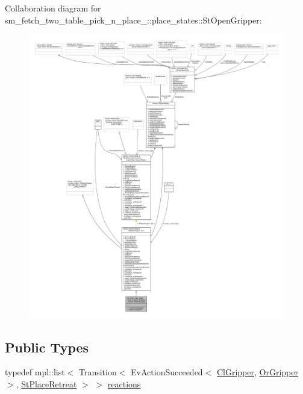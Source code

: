 Collaboration diagram for sm\+\_\+fetch\+\_\+two\+\_\+table\+\_\+pick\+\_\+n\+\_\+place\+\_\+:\+:place\+\_\+states\+:\+:St\+Open\+Gripper\+:
\nopagebreak
\begin{figure}[H]
\begin{center}
\leavevmode
\includegraphics[width=350pt]{structsm__fetch__two__table__pick__n__place__1_1_1place__states_1_1StOpenGripper__coll__graph}
\end{center}
\end{figure}
\subsection*{Public Types}
\begin{DoxyCompactItemize}
\item 
typedef mpl\+::list$<$ Transition$<$ Ev\+Action\+Succeeded$<$ \hyperlink{classsm__fetch__two__table__pick__n__place__1_1_1cl__gripper_1_1ClGripper}{Cl\+Gripper}, \hyperlink{classsm__fetch__two__table__pick__n__place__1_1_1OrGripper}{Or\+Gripper} $>$, \hyperlink{structsm__fetch__two__table__pick__n__place__1_1_1place__states_1_1StPlaceRetreat}{St\+Place\+Retreat} $>$ $>$ \hyperlink{structsm__fetch__two__table__pick__n__place__1_1_1place__states_1_1StOpenGripper_a9440af06479efb0aad6bce0d9469c8c9}{reactions}
\end{DoxyCompactItemize}
